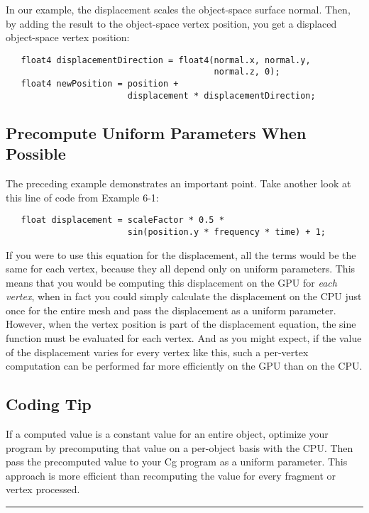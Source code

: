 \documentclass[../main.tex]{subfiles}
\begin{document}
In our example, the displacement scales the object-space surface normal. Then, by adding the result to the object-space vertex position, you get a displaced object-space vertex position:

\FloatBarrier
\begin{lstlisting}
   float4 displacementDirection = float4(normal.x, normal.y,
                                         normal.z, 0);
   float4 newPosition = position +
                        displacement * displacementDirection;
\end{lstlisting}
\FloatBarrier

\subsection*{Precompute Uniform Parameters When Possible}

The preceding example demonstrates an important point. Take another look at this line of code from Example 6-1:

\FloatBarrier
\begin{lstlisting}
   float displacement = scaleFactor * 0.5 *
                        sin(position.y * frequency * time) + 1;
\end{lstlisting}
\FloatBarrier

If you were to use this equation for the displacement, all the terms would be the same for each vertex, because they all depend only on uniform parameters. This means that you would be computing this displacement on the GPU for \textit{each vertex}, when in fact you could simply calculate the displacement on the CPU just once for the entire mesh and pass the displacement as a uniform parameter. However, when the vertex position is part of the displacement equation, the sine function must be evaluated for each vertex. And as you might expect, if the value of the displacement varies for every vertex like this, such a per-vertex computation can be performed far more efficiently on the GPU than on the CPU.

\subsection*{Coding Tip}

If a computed value is a constant value for an entire object, optimize your program by precomputing that value on a per-object basis with the CPU. Then pass the precomputed value to your Cg program as a uniform parameter. This approach is more efficient than recomputing the value for every fragment or vertex processed.
\hrule
\end{document}
